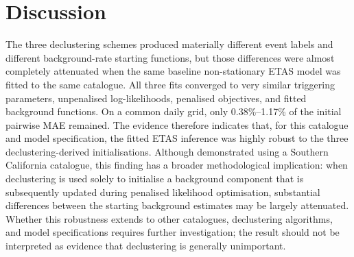 \begin{table}[htbp]
\centering
\caption{Limited ETAS specification robustness with the nearest-neighbour
initialisation fixed. Background MAE and correlation compare each fitted
background function with the baseline.}
\label{tab:robustness}
\end{table}

\section{Discussion}
\label{sec:discussion}

The three declustering schemes produced materially different event labels and
different background-rate starting functions, but those differences were
almost completely attenuated when the same baseline non-stationary ETAS model
was fitted to the same catalogue. All three fits converged to very similar
triggering parameters, unpenalised log-likelihoods, penalised objectives, and
fitted background functions. On a common daily grid, only 0.38\%--1.17\% of
the initial pairwise MAE remained. The evidence therefore indicates that, for
this catalogue and model specification, the fitted ETAS inference was highly
robust to the three declustering-derived initialisations. Although
demonstrated using a Southern California catalogue, this finding has a
broader methodological implication: when declustering is used solely to
initialise a background component that is subsequently updated during
penalised likelihood optimisation, substantial differences between the
starting background estimates may be largely attenuated. Whether this
robustness extends to other catalogues, declustering algorithms, and model
specifications requires further investigation; the result should not be
interpreted as evidence that declustering is generally unimportant.

